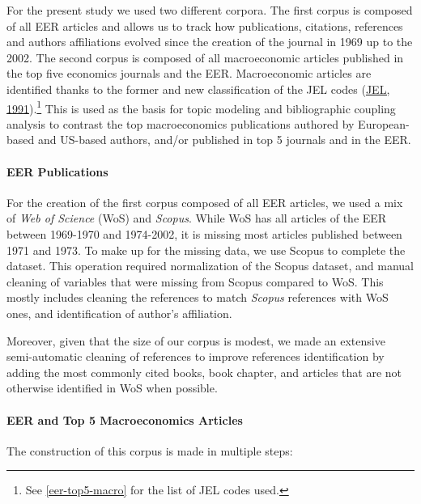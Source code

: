 \documentclass[]{elsarticle} %
\begin{document}
For the present study we used two different corpora. The first corpus is
composed of all EER articles and allows us to track how publications,
citations, references and authors affiliations evolved since the
creation of the journal in 1969 up to the 2002. The second corpus is
composed of all macroeconomic articles published in the top five
economics journals and the EER. Macroeconomic articles are identified
thanks to the former and new classification of the JEL codes
(\protect\hyperlink{ref-jel1991}{JEL, 1991}).\footnote{See
  \ref{eer-top5-macro} for the list of JEL codes used.} This is used as
the basis for topic modeling and bibliographic coupling analysis to
contrast the top macroeconomics publications authored by European-based
and US-based authors, and/or published in top 5 journals and in the EER.

\hypertarget{eer-publications}{%
\paragraph*{EER Publications}\label{eer-publications}}

For the creation of the first corpus composed of all EER articles, we
used a mix of \emph{Web of Science} (WoS) and \emph{Scopus}. While WoS
has all articles of the EER between 1969-1970 and 1974-2002, it is
missing most articles published between 1971 and 1973. To make up for
the missing data, we use Scopus to complete the dataset. This operation
required normalization of the Scopus dataset, and manual cleaning of
variables that were missing from Scopus compared to WoS. This mostly
includes cleaning the references to match \emph{Scopus} references with
WoS ones, and identification of author's affiliation.

Moreover, given that the size of our corpus is modest, we made an
extensive semi-automatic cleaning of references to improve references
identification by adding the most commonly cited books, book chapter,
and articles that are not otherwise identified in WoS when possible.

\hypertarget{eer-top5-macro}{%
\paragraph*{EER and Top 5 Macroeconomics
Articles}\label{eer-top5-macro}}

The construction of this corpus is made in multiple steps:
\end{document}
